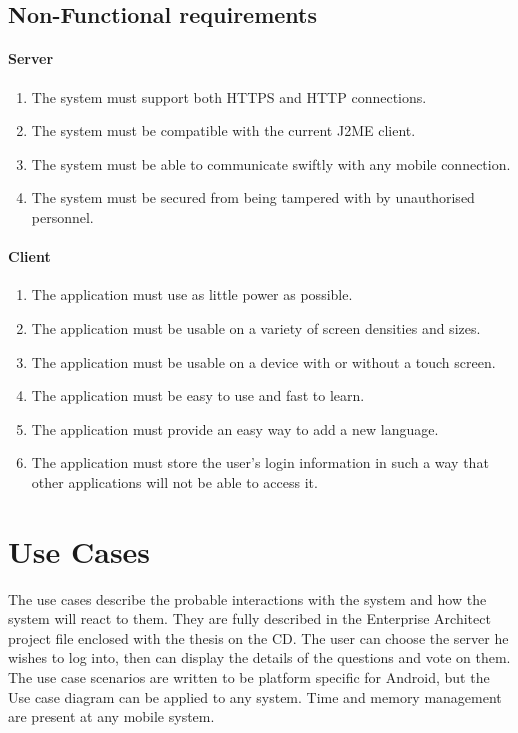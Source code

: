 \documentclass[11pt,twoside,a4paper]{book}
\begin{document}
\subsection{Non-Functional requirements}
\paragraph*{Server}
\begin{enumerate}
\item  The system must support both HTTPS and HTTP connections.
\item The system must be compatible with the current J2ME client.
\item The system must be able to communicate swiftly with any mobile connection.
\item The system must be secured from being tampered with by unauthorised personnel.
\end{enumerate}
\paragraph*{Client}
\begin{enumerate}
\item The application must use as little power as possible.
\item The application must be usable on a variety of screen densities and sizes.
\item The application must be usable on a device with or without a touch screen.
\item The application must be easy to use and fast to learn.
\item The application must provide an easy way to add a new language.
\item The application must store the user's login information in such a way that other applications will not be able to access it.
\end{enumerate}
\section{Use Cases}
The use cases describe the probable interactions with the system and how the system will react to them. They are fully described in the Enterprise Architect project file enclosed with the thesis on the CD. The user can choose the server he wishes to log into, then can display the details of the questions and vote on them. The use case scenarios are written to be platform specific for Android, but the Use case diagram can be applied to any system. Time and memory management are present at any mobile system.
\end{document}
